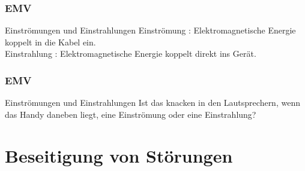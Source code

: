 \begin{frame}
    \frametitle{EMV}
    \begin{center}
	\begin{block}{Einströmungen und Einstrahlungen}
Einströmung : Elektromagnetische Energie koppelt in die Kabel ein. \\
Einstrahlung : Elektromagnetische Energie koppelt direkt ins Gerät.
	\end{block}
    \end{center}
\end{frame}

\begin{frame}
    \frametitle{EMV}
    \begin{center}
	\begin{block}{Einströmungen und Einstrahlungen}
		Ist das knacken in den Lautsprechern, wenn das Handy daneben liegt, eine Einströmung oder eine Einstrahlung?
	\end{block}
    \end{center}
\end{frame}

\section*{Beseitigung von Störungen}

